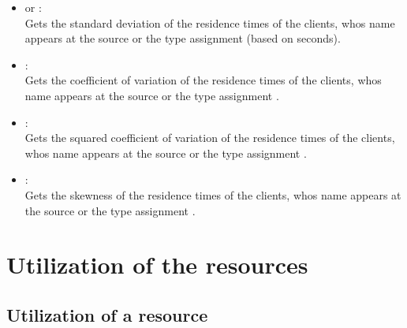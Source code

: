 \begin{itemize}
\item
{} or :\\
Gets the standard deviation of the residence times of the clients, whos name appears at the source or the type assignment  (based on seconds).

\item
{}:\\
Gets the coefficient of variation of the residence times of the clients, whos name appears at the source or the type assignment .

\item
{}:\\
Gets the squared coefficient of variation of the residence times of the clients, whos name appears at the source or the type assignment .

\item
{}:\\
Gets the skewness of the residence times of the clients, whos name appears at the source or the type assignment .

\end{itemize}



\section{Utilization of the resources}



\subsection{Utilization of a resource}

